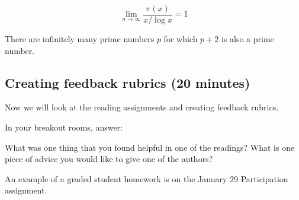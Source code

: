 \documentclass[letterpaper, 11 pt]{article}
\begin{document}
\begin{thm}
\[\lim_{n\to\infty}\frac{\pi(x)}{x/\log x}=1\] 
\end{thm}

\begin{conj}
 There are infinitely many prime numbers $p$ for which $p+2$ is also a prime number. 
\end{conj}

\subsection{Creating feedback rubrics (20 minutes)}

Now we will look at the reading assignments and creating feedback rubrics. 

In your breakout rooms, answer:
\begin{br}
 What was one thing that you found helpful in one of the readings?
What is one piece of advice you would like to give one of the authors?
\end{br}


An example of a graded student homework is on the January 29 Participation assignment.
\end{document}
